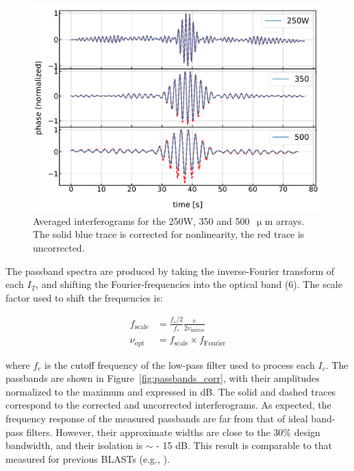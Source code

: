\begin{figure}[!htbp]
\centering
\includegraphics[width=\textwidth]{figures/blast_data/fts/fts_avg_interfs_raw}
\caption[Averaged interferograms for the 250W, 350 and  arrays.]{Averaged interferograms for the 250W, 350 and 500~$\upmu$m arrays. The solid blue trace is corrected for nonlinearity, the red trace is uncorrected.}
\label{fig:avg interfs}
\end{figure}

The passband spectra are produced by taking the inverse-Fourier transform of each $I_{T}$, and shifting the Fourier-frequencies into the optical band (6). The scale factor used to shift the frequencies is:

\begin{equation}\label{eq:fts scale}
  \begin{aligned}
  f_{\mathrm{scale}} &= \frac{f_{s}/2}{f_{c}}\frac{c}{2v_{\mathrm{mirror}}} \\
  \nu_{\mathrm{opt}} &= f_{\mathrm{scale}} \times f_{\mathrm{Fourier}}
  \end{aligned}
\end{equation}

where $f_{c}$ is the cutoff frequency of the low-pass filter used to process each $I_{c}$. The passbands are shown in Figure~\ref{fig:passbands_corr}, with their amplitudes normalized to the maximum and expressed in dB. The solid and dashed traces correspond to the corrected and uncorrected interferograms. As expected, the frequency response of the measured passbands are far from that of ideal band-pass filters. However, their approximate widths are close to the 30\% design bandwidth, and their isolation is $\sim$ - 15 dB. This result is comparable to that measured for previous BLASTs (e.g., \citet{galitzki}).

